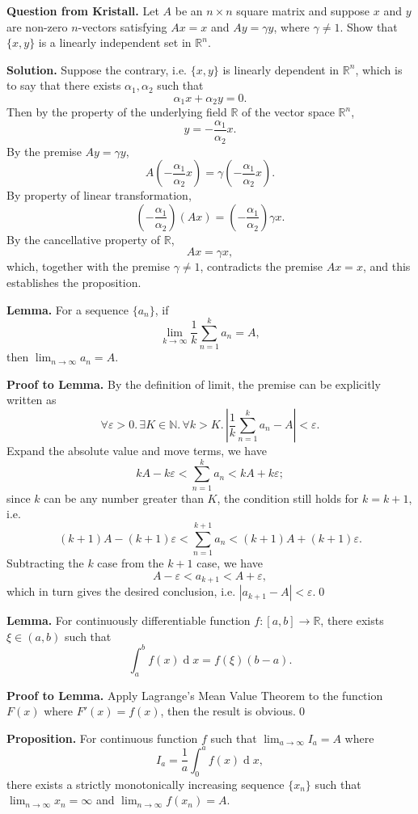 \documentclass[10pt]{article}
\begin{document}
\begin{CJK*}{UTF8}{gbsn}
\newpage
\textbf{Question from Kristall.} Let $A$ be an $n\times n$ square matrix and suppose $x$ and $y$ are non-zero $n$-vectors satisfying $Ax = x$ and $Ay = \gamma y$, where $\gamma\neq1$. Show that $\{x, y\}$ is a linearly independent set in $\mathbb{R}^n$.

\textbf{Solution.} Suppose the contrary, i.e. $\{x,y\}$ is linearly dependent in $\mathbb{R}^n$, which is to say that there exists $\alpha_1,\alpha_2$ such that $$\alpha_1x+\alpha_2y=0.$$ Then by the property of the underlying field $\mathbb{R}$ of the vector space $\mathbb{R}^n$, $$y=-\frac{\alpha_1}{\alpha_2}x.$$ By the premise $Ay=\gamma y$, $$A\left(-\frac{\alpha_1}{\alpha_2}x\right)=\gamma\left(-\frac{\alpha_1}{\alpha_2}x\right).$$ By property of linear transformation, $$\left(-\frac{\alpha_1}{\alpha_2}\right)(Ax)=\left(-\frac{\alpha_1}{\alpha_2}\right)\gamma x.$$ By the cancellative property of $\mathbb{R}$, $$Ax=\gamma x,$$ which, together with the premise $\gamma\neq1$, contradicts the premise $Ax=x$, and this establishes the proposition.

\newpage
\textbf{Lemma.} For a sequence $\{a_n\}$, if $$\lim_{k\to\infty}\frac{1}{k}\sum_{n=1}^ka_n=A,$$ then $\displaystyle\lim_{n\to\infty}a_n=A$.

\textbf{Proof to Lemma.} By the definition of limit, the premise can be explicitly written as $$\forall\varepsilon>0.\,\exists K\in\mathbb{N}.\,\forall k>K.\,\left|\frac{1}{k}\sum_{n=1}^{k}a_n-A\right|<\varepsilon.$$ Expand the absolute value and move terms, we have $$kA-k\varepsilon<\sum_{n=1}^ka_n<kA+k\varepsilon;$$ since $k$ can be any number greater than $K$, the condition still holds for $k=k+1$, i.e. $$(k+1)A-(k+1)\varepsilon<\sum_{n=1}^{k+1}a_n<(k+1)A+(k+1)\varepsilon.$$ Subtracting the $k$ case from the $k+1$ case, we have $$A-\varepsilon<a_{k+1}<A+\varepsilon,$$ which in turn gives the desired conclusion, i.e. $|a_{k+1}-A|<\varepsilon$.\qed

\textbf{Lemma.} For continuously differentiable function $f:[a,b]\to\mathbb{R}$, there exists $\xi\in(a,b)$ such that $$\int_a^bf(x)\operatorname{d}x=f(\xi)(b-a).$$

\textbf{Proof to Lemma.} Apply Lagrange's Mean Value Theorem to the function $F(x)$ where $F'(x)=f(x)$, then the result is obvious.\qed

\textbf{Proposition.} For continuous function $f$ such that $\displaystyle\lim_{a\to\infty}I_a=A$ where $$I_a=\frac{1}{a}\int_0^af(x)\operatorname{d}x,$$ there exists a strictly monotonically increasing sequence $\{x_n\}$ such that $\displaystyle\lim_{n\to\infty}x_n=\infty$ and $\displaystyle\lim_{n\to\infty}f(x_n)=A$.


\end{CJK*}
\end{document}
